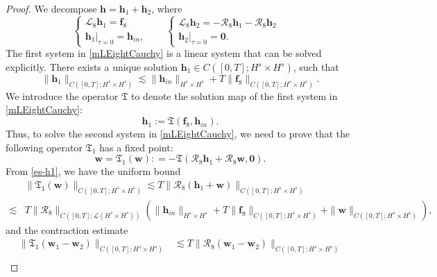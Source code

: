 \documentclass[10pt,a4paper]{amsart}
\newcommand{\mL}{\mathcal{L}}
\newcommand{\mR}{\mathcal{R}}
\begin{document}
\begin{proof}
We decompose $\mathbf{h} = \mathbf{h}_1+ \mathbf{h}_2$, where
\begin{equation} \label{mLEightCauchy}
\left\{
\begin{array}{lr}
\mL_8 \mathbf{h}_1 = \mathbf{f}_8 &  \\
\mathbf{h}_1|_{\tau=0} = \mathbf{h}_{in},&
\end{array}
\right. \quad
\left\{
\begin{array}{lr}
\mL_8 \mathbf{h}_2 = -\mR_8 \mathbf{h}_1 -\mR_8 \mathbf{h}_2 &  \\
\mathbf{h}_2|_{\tau=0} = \mathbf{0}.&
\end{array}
\right.
\end{equation}
The first system in \eqref{mLEightCauchy} is a linear system that can be solved explicitly.
There exists a unique solution $\mathbf{h}_1\in C([0,T]; H^s\times H^s)$, such that
\begin{equation}\label{es-h1}
 \| \mathbf{h}_1\|_{C([0,T]; H^s\times H^s)} \lesssim \|\mathbf{h}_{in} \|_{H^s\times H^s} + T\| \mathbf{f}_8\|_{C([0,T]; H^s\times H^s)}.
\end{equation}
We introduce the operator $\mathfrak{T}$ to denote the solution map of the first system in \eqref{mLEightCauchy}:
\begin{equation*}
\mathbf{h}_1:=\mathfrak{T}(\mathbf{f}_8,\mathbf{h}_{in}).
\end{equation*}
Thus, to solve the second system in \eqref{mLEightCauchy}, we need to prove that the following operator $\mathfrak{T}_1$ has a fixed point:
\begin{equation*}
\mathbf{w}= \mathfrak{T}_1(\mathbf{w}): =-\mathfrak{T}(\mathcal{R}_8\mathbf{h}_1+\mathcal{R}_8\mathbf{w},\mathbf{0}).
\end{equation*}
From \eqref{es-h1}, we have the uniform bound
\begin{align*}
&\|\mathfrak{T}_1(\mathbf{w})\|_{C([0,T]; H^s\times H^s)}\lesssim T\| \mathcal{R}_8(\mathbf{h}_1+\mathbf{w})\|_{C([0,T]; H^s\times H^s)}\\
\lesssim &T\|\mR_8\|_{C([0,T]; \mL (H^s\times H^s))}\left(\|\mathbf{h}_{in} \|_{H^s\times H^s} + T\| \mathbf{f}_8\|_{C([0,T]; H^s\times H^s)}+\| \mathbf{w}\|_{C([0,T]; H^s\times H^s)}\right), 
\end{align*}
and the contraction estimate
\begin{align*}
\|\mathfrak{T}_1(\mathbf{w}_1-\mathbf{w}_2)\|_{C([0,T]; H^s\times H^s)}&\lesssim T\| \mathcal{R}_8(\mathbf{w}_1-\mathbf{w}_2)\|_{C([0,T]; H^s\times H^s)}\\

\end{align*}
\end{proof}
\end{document}
